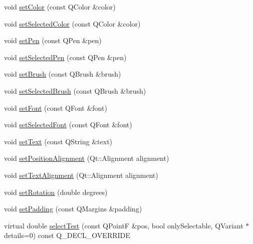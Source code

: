 \begin{DoxyCompactItemize}
\item 
void \hyperlink{classQCPItemText_aa51efc0841fe52da9eaf8aff6fc8a8b2}{set\+Color} (const Q\+Color \&color)
\item 
void \hyperlink{classQCPItemText_ae7ba0bdb75c897b028388e45bfd435fa}{set\+Selected\+Color} (const Q\+Color \&color)
\item 
void \hyperlink{classQCPItemText_a9b9ec6eea0eb0603977ff84d4c78d0a3}{set\+Pen} (const Q\+Pen \&pen)
\item 
void \hyperlink{classQCPItemText_a291febe586f0da3f1c392e77bef4aa20}{set\+Selected\+Pen} (const Q\+Pen \&pen)
\item 
void \hyperlink{classQCPItemText_a1c7e131516df2ed8d941ef31240ded8e}{set\+Brush} (const Q\+Brush \&brush)
\item 
void \hyperlink{classQCPItemText_a6b8377eeb2af75eb9528422671ac16cb}{set\+Selected\+Brush} (const Q\+Brush \&brush)
\item 
void \hyperlink{classQCPItemText_a94ad60ebe04f5c07c35e7c2029e96b1f}{set\+Font} (const Q\+Font \&font)
\item 
void \hyperlink{classQCPItemText_a0be2841772f83663c4db307928b82816}{set\+Selected\+Font} (const Q\+Font \&font)
\item 
void \hyperlink{classQCPItemText_a3dacdda0ac88f99a05b333b977c48747}{set\+Text} (const Q\+String \&text)
\item 
void \hyperlink{classQCPItemText_a781cdf8c640fc6a055dcff1e675c8c7a}{set\+Position\+Alignment} (Qt\+::\+Alignment alignment)
\item 
void \hyperlink{classQCPItemText_ab5bc0684c4d1bed81949a11b34dba478}{set\+Text\+Alignment} (Qt\+::\+Alignment alignment)
\item 
void \hyperlink{classQCPItemText_a4bcc10cd97952c3f749d75824b5077f0}{set\+Rotation} (double degrees)
\item 
void \hyperlink{classQCPItemText_aeea8a3e01f135f9dd0bb08f51db66310}{set\+Padding} (const Q\+Margins \&padding)
\item 
virtual double \hyperlink{classQCPItemText_a676aaec10ad3cc4d7d0e4847db04c838}{select\+Test} (const Q\+PointF \&pos, bool only\+Selectable, Q\+Variant $\ast$details=0) const Q\+\_\+\+D\+E\+C\+L\+\_\+\+O\+V\+E\+R\+R\+I\+DE
\end{DoxyCompactItemize}
